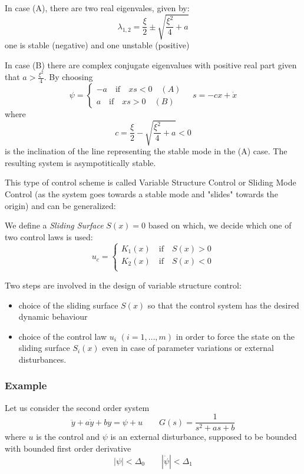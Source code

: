 \documentclass{book}
\begin{document}
In case (A), there are two real eigenvales, given by:
\[
    \lambda_{1,2} = \displaystyle\frac{\xi}{2}\pm \sqrt{\displaystyle\frac{\xi^2}{4}+a}
\]
one is stable (negative) and one unstable (positive)

In case (B) there are complex conjugate eigenvalues with positive real part given that $a>\frac{\xi^2}{4}$. 
By choosing
\[
    \psi = \begin{cases}
        -a \quad \text{if} \quad xs<0 \quad (A)\\
        a \quad \text{if} \quad xs>0 \quad (B)
    \end{cases} \quad s = -cx +\dot{x}
\]
where
\[
    c=\frac{\xi}{2}-\sqrt{\frac{\xi^2}{4}+a}<0
\]
is the inclination of the line representing the stable mode in the (A) case. The resulting system is asympotitically stable.

This type of control scheme is called Variable Structure Control or Sliding Mode Control (as the system goes towards a stable mode and "slides" towards the origin) and can be generalized:

We define a \emph{Sliding Surface} $S(x)=0$ based on which, we decide which one of two control laws is used:
\[
    u_c = \begin{cases}
        K_1(x) \quad \text{if} \quad S(x)>0\\
        K_2(x) \quad \text{if} \quad S(x)<0\\
    \end{cases}
\]

Two steps are involved in the design of variable structure control:
\begin{itemize}
    \item choice of the sliding surface $S(x)$ so that the control system has the desired dynamic behaviour 
    \item choice of the control law $u_i$ $(i=1,\dots,m)$ in order to force the state on the sliding surface $S_i(x)$ even in case of parameter variations or external disturbances. 
\end{itemize}
\subsubsection{Example}
Let us consider the second order system
\[
    \ddot{y} + a\dot{y} + by = \psi +u \qquad G(s) = \displaystyle\frac{1}{s^2+as+b}
\]
where $u$ is the control and $\psi$ is an external disturbance, supposed to be bounded with bounded first order derivative
\[
    |\psi|<\Delta_0 \qquad |\dot{\psi}|<\Delta_1
\]
\end{document}
